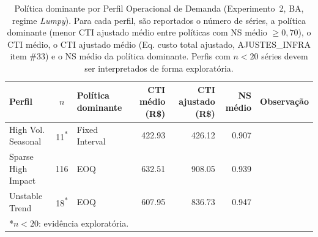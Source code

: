 \begin{table}[htb]
\centering
\small
\caption{Política dominante por Perfil Operacional de Demanda (Experimento~2, BA, regime \textit{Lumpy}). Para cada perfil, são reportados o número de séries, a política dominante (menor CTI ajustado médio entre políticas com NS médio $\geq 0{,}70$), o CTI médio, o CTI ajustado médio (Eq. custo total ajustado, AJUSTES\_INFRA item \#33) e o NS médio da política dominante. Perfis com $n < 20$ séries devem ser interpretados de forma exploratória.}
\label{tab:dominancia_por_perfil}
\begin{tabular}{@{}p{3.0cm}clrrrl@{}}
\toprule
Perfil & $n$ & Política dominante & CTI médio (R\$) & CTI ajustado (R\$) & NS médio & Observação \\
\midrule
High Vol. Seasonal & 11\textsuperscript{*} & Fixed Interval & 422.93 & 426.12 & 0.907 &  \\
Sparse High Impact & 116 & EOQ & 632.51 & 908.05 & 0.939 &  \\
Unstable Trend & 18\textsuperscript{*} & EOQ & 607.95 & 836.73 & 0.947 &  \\
\bottomrule
\multicolumn{7}{l}{\scriptsize{*}$n < 20$: evidência exploratória.} \\
\end{tabular}
\end{table}
